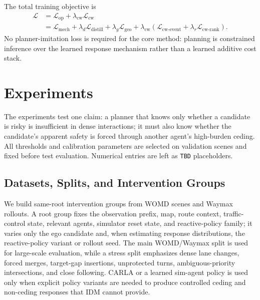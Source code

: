 \documentclass[10pt]{article}
\begin{document}
The total training objective is
\begin{equation}
\begin{aligned}
    \mathcal L
    &=
    \mathcal L_{\mathrm{op}}
    +
    \lambda_{\mathrm{cw}}\mathcal L_{\mathrm{cw}} \\
    &=
    \mathcal L_{\mathrm{mech}}
    +
    \lambda_d\mathcal L_{\mathrm{distill}}
    +
    \lambda_g\mathcal L_{\mathrm{geo}}
    +
    \lambda_{\mathrm{cw}}
    \left(
    \mathcal L_{\mathrm{cw\text{-}event}}
    +
    \lambda_r\mathcal L_{\mathrm{cw\text{-}rank}}
    \right).
\end{aligned}
\label{eq:total_loss}
\end{equation}
No planner-imitation loss is required for the core method: planning is constrained inference over the learned response mechanism rather than a learned additive cost stack.


\section{Experiments}
\label{sec:experiments}

The experiments test one claim: a planner that knows only whether a candidate is risky is insufficient in dense interactions; it must also know whether the candidate's apparent safety is forced through another agent's high-burden ceding. All thresholds and calibration parameters are selected on validation scenes and fixed before test evaluation. Numerical entries are left as \texttt{TBD} placeholders.

\subsection{Datasets, Splits, and Intervention Groups}
\label{sec:exp_data}

We build same-root intervention groups from WOMD scenes and Waymax rollouts. A root group fixes the observation prefix, map, route context, traffic-control state, relevant agents, simulator reset state, and reactive-policy family; it varies only the ego candidate and, when estimating response distributions, the reactive-policy variant or rollout seed. The main WOMD/Waymax split is used for large-scale evaluation, while a stress split emphasizes dense lane changes, forced merges, target-gap insertions, unprotected turns, ambiguous-priority intersections, and close following. CARLA or a learned sim-agent policy is used only when explicit policy variants are needed to produce controlled ceding and non-ceding responses that IDM cannot provide.
\end{document}
